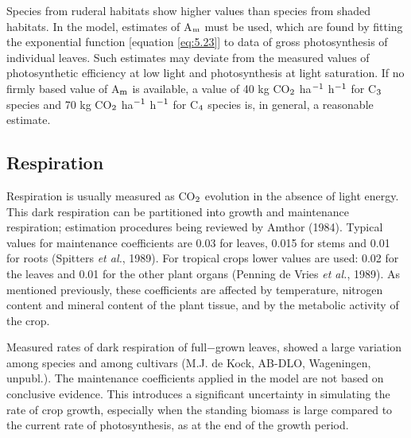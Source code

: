 Species from ruderal habitats show higher values than species from shaded habitats. In the model, estimates of A$_{{\rm m}}$ must be used, which are found by fitting the exponential function [equation \ref{eq:5.23}] to data of gross photosynthesis of individual leaves. Such estimates may deviate from the measured values of photosynthetic efficiency at low light and photosynthesis at light saturation. If no firmly based value of A$_{{\rm m}}$ is available, a value of 40 kg CO$_{{\rm 2}}$ ha$^{{\rm -1}}$ h$^{{\rm -}{1}}$ for C$_{{\rm 3}}$ species and 70 kg CO$_{{\rm 2}}$ ha$^{{\rm -1}}$ h$^{{\rm -1}}$ for C$_{{\rm 4}}$
species is, in general, a reasonable estimate.

\subsection{Respiration} 

Respiration is usually measured as CO$_{{\rm 2}}$ evolution in the absence of light energy. This dark respiration can be partitioned into growth and maintenance respiration; estimation procedures being reviewed by Amthor (1984). Typical values for maintenance coefficients are 0.03 for leaves, 0.015 for stems and 0.01 for roots (Spitters {\it et al.}, 1989). For tropical crops lower values are used: 0.02 for the leaves and 0.01 for the other plant organs (Penning de Vries {\it et al.}, 1989). As mentioned previously, these coefficients are affected by temperature, nitrogen content and mineral content of the plant tissue, and by the metabolic activity of the crop.

Measured rates of dark respiration of full$-$grown leaves, showed a large variation among species and among cultivars (M.J. de Kock, AB-DLO, Wageningen, unpubl.). The maintenance coefficients applied in the model are not based on conclusive evidence. This introduces a significant uncertainty in simulating the rate of crop growth, especially when the standing biomass is large compared to the current rate of photosynthesis, as at the end of the growth period.   


